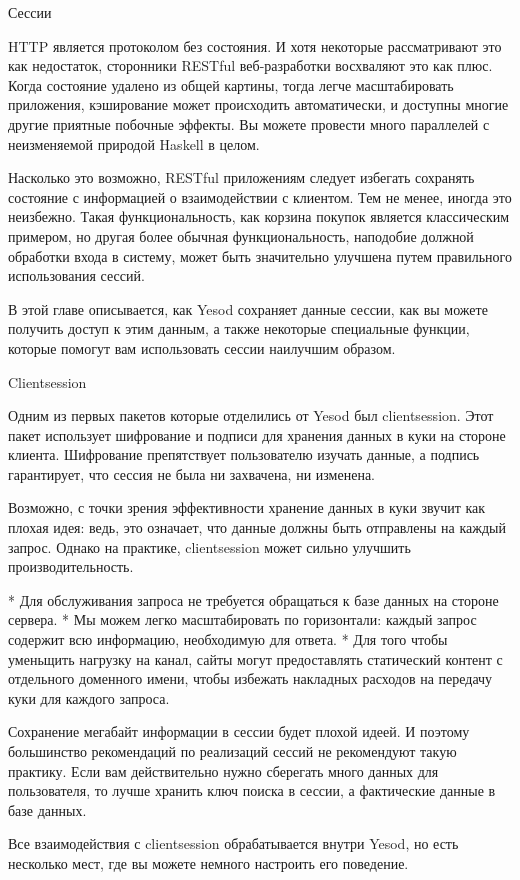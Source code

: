 Сессии

HTTP является протоколом без состояния. И хотя некоторые рассматривают
это как недостаток, сторонники RESTful веб-разработки восхваляют это
как плюс. Когда состояние удалено из общей картины, тогда легче
масштабировать приложения, кэширование может происходить
автоматически, и доступны многие другие приятные побочные эффекты. Вы
можете провести много параллелей с неизменяемой природой Haskell в
целом.

Насколько это возможно, RESTful приложениям следует избегать сохранять
состояние с информацией о взаимодействии с клиентом. Тем не менее,
иногда это неизбежно. Такая функциональность, как корзина покупок
является классическим примером, но другая более обычная
функциональность, наподобие должной обработки входа в систему, может
быть значительно улучшена путем правильного использования сессий.

В этой главе описывается, как Yesod сохраняет данные сессии, как вы
можете получить доступ к этим данным, а также некоторые специальные
функции, которые помогут вам использовать сессии наилучшим образом.

Clientsession

Одним из первых пакетов которые отделились от Yesod был clientsession.
Этот пакет использует шифрование и подписи для хранения данных в куки
на стороне клиента. Шифрование препятствует пользователю изучать
данные, а подпись гарантирует, что сессия не была ни захвачена, ни
изменена.

Возможно, с точки зрения эффективности хранение данных в куки звучит
как плохая идея: ведь, это означает, что данные должны быть отправлены
на каждый запрос. Однако на практике, clientsession может сильно
улучшить производительность.

* Для обслуживания запроса не требуется обращаться к базе данных на
стороне сервера.
* Мы можем легко масштабировать по горизонтали: каждый запрос содержит
всю информацию, необходимую для ответа.
* Для того чтобы уменьщить нагрузку на канал, сайты могут
предоставлять статический контент с отдельного доменного имени, чтобы
избежать накладных расходов на передачу куки для каждого запроса.

Сохранение мегабайт информации в сессии будет плохой идеей. И поэтому
большинство рекомендаций по реализаций сессий не рекомендуют такую 
практику. Если вам действительно нужно сберегать много данных для
пользователя, то лучше хранить ключ поиска в сессии, а фактические
данные в базе данных.

Все взаимодействия с clientsession обрабатывается внутри Yesod, но
есть несколько мест, где вы можете немного настроить его поведение.

